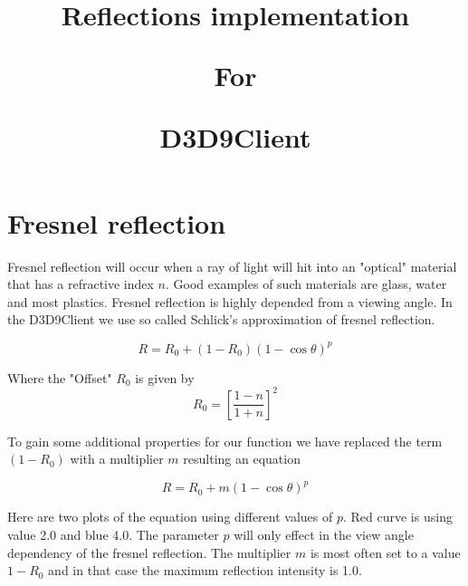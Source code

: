 \documentclass[twocolumn]{report}
\newenvironment{twocol}[0]{%
\begin{list}{}{%
\onecolumn
\setlength{\leftmargin}{0.15cm}%
\setlength{\rightmargin}{0.15cm}%
\setlength{\topmargin}{0cm}%
\setlength{\headheight}{0cm}%
\setlength{\headsep}{0cm}%
\setlength{\textheight}{24cm}%
}%
\item[]}{\end{list}}
\begin{document}
\title{
\begin{center}
\textbf{Reflections implementation}\end{center}
\begin{center}
\textbf{For}\end{center}
\begin{center}
\textbf{D3D9Client}\end{center}
\vspace{-2cm}
}

\maketitle

\begin{twocol}

\section*{Fresnel reflection}

Fresnel reflection will occur when a ray of light will hit into an "optical" material that has a refractive index $n$. Good examples of such materials are glass, water and most plastics. Fresnel reflection is highly depended from a viewing angle. In the D3D9Client we use so called Schlick's approximation of fresnel reflection. 

\begin{equation}
 R = R_0 + (1-R_0)(1-\cos\theta)^p
\end{equation}

Where the "Offset" $R_0$ is given by
\begin{equation}
R_0 = \left[\frac{1-n}{1+n}\right]^2
\end{equation}

To gain some additional properties for our function we have replaced the term $(1-R_0)$ with a multiplier $m$ resulting an equation

\begin{equation}
 R = R_0 + m(1-\cos\theta)^p
\end{equation}

Here are two plots of the equation using different values of $p$. Red curve is using value 2.0 and blue 4.0. The parameter $p$ will only effect in the view angle dependency of the fresnel reflection. The multiplier $m$ is most often set to a value $1-R_0$ and in that case the maximum reflection intensity is 1.0.


\end{twocol}
\end{document}
